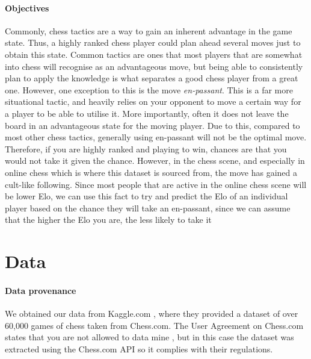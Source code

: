 \documentclass[10pt,a4paper]{article}
\begin{document}
\begin{multicols}{2}
\paragraph{Objectives}

Commonly, chess tactics are a way to gain an inherent advantage in the game state. Thus, a highly ranked chess player could plan ahead several moves just to obtain this state. Common tactics are ones that most players that are somewhat into chess will recognise as an advantageous move, but being able to consistently plan to apply the knowledge is what separates a good chess player from a great one. However, one exception to this is the move \textit{en-passant}. This is a far more situational tactic, and heavily relies on your opponent to move a certain way for a player to be able to utilise it. More importantly, often it does not leave the board in an advantageous state for the moving player. Due to this, compared to most other chess tactics, generally using en-passant will not be the optimal move. Therefore, if you are highly ranked and playing to win, chances are that you would not take it given the chance. However, in the chess scene, and especially in online chess which is where this dataset is sourced from, the move has gained a cult-like following. Since most people that are active in the online chess scene will be lower Elo, we can use this fact to try and predict the Elo of an individual player based on the chance they will take an en-passant, since we can assume that the higher the Elo you are, the less likely to take it

\section{Data}


\paragraph{Data provenance}
We obtained our data from Kaggle.com \cite{Kaggle}, where they provided a dataset of over 60,000 games of chess taken from Chess.com. The User Agreement on Chess.com states that you are not allowed to data mine \cite{ChessT&C}, but in this case the dataset was extracted using the Chess.com API so it complies with their regulations.


\end{multicols}
\end{document}
